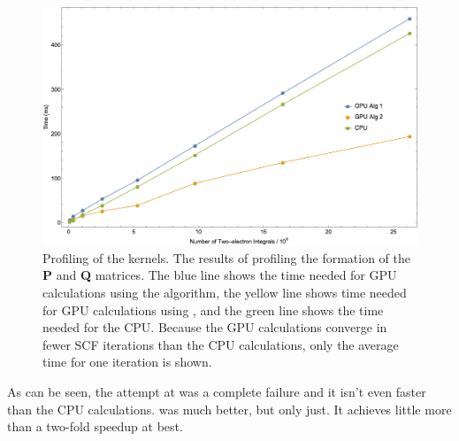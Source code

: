 \begin{figure}[h!]
\includegraphics[width=1\textwidth]{Figures/formpqprof.png}
\caption[Profiling of the  kernels.]
{Profiling of the  kernels. The results of profiling the formation of the \textbf{P} and \textbf{Q} matrices. The blue line shows the time needed for GPU calculations using the  algorithm, the yellow line shows time needed for GPU calculations using , and the green line shows the time needed for the CPU. Because the GPU calculations converge in fewer SCF iterations than the CPU calculations, only the average time for one iteration is shown.}
\label{fig:formpqprof}
\end{figure}

As can be seen, the attempt at  was a complete failure and it isn't even faster than the CPU calculations.  was much better, but only just. It achieves little more than a two-fold speedup at best. 

